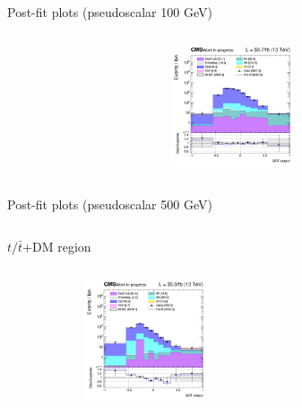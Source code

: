 \documentclass[8pt]{beamer}
\begin{document}
\begin{frame}{Post-fit plots (pseudoscalar 100 GeV)}
\begin{columns}
\begin{column}{0.33\textwidth}
\begin{center}
     			\includegraphics[width=1.0\textwidth, height=100pt]{figs/postfits/2018/log_cratio_TTbar_topCR_ll_BDT_ttDM100_TTbar_BDT_output_pseudoscalar100_customBinsAttempt7.png}
    		\end{center}		
		\end{column}
\end{columns} \vfill
\end{frame}

\begin{frame}{Post-fit plots (pseudoscalar 500 GeV)}
\begin{columns}
\begin{column}{1.09\textwidth}
\begin{block}{\centering $t/\bar t$+DM region}\end{block} \vspace{10pt}
\end{column}
\end{columns} \vspace{-24pt}
\begin{columns}
		\begin{column}{0.33\textwidth}
			\begin{center}
			\begin{block}{}\end{block}	
     			\includegraphics[width=1.0\textwidth, height=100pt]{figs/postfits/2016/log_cratio_ST_topCR_ll_BDT_tDM500_TTbar_BDT_output_pseudoscalar500_customBinsAttempt7.png}
    		\end{center}		
		\end{column} 
		\begin{column}{0.33\textwidth}
			\begin{center}
			\begin{block}{}\end{block}	

\end{center}
\end{column}
\end{columns}
\end{frame}
\end{document}
